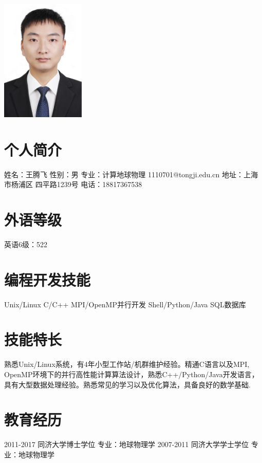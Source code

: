 \documentclass[]{friggeri-cv}
\begin{document}
       {}
\begin{aside}
\includegraphics[width=4cm]{IMG_4827small.jpg}
  \section{个人简介}
   姓名：王腾飞 
   性别：男
   专业：计算地球物理
   1110701@tongji.edu.cn
   地址：上海市杨浦区
   四平路1239号
   电话：18817367538
  \section{外语等级}
  英语6级：522
  \section{编程开发技能}
	Unix/Linux
    C/C++
	MPI/OpenMP并行开发
    Shell/Python/Java
	SQL数据库
\end{aside}

\section{技能特长}
\large
熟悉Unix/Linux系统，有4年小型工作站/机群维护经验。精通C语言以及MPI,\\
OpenMP环境下的并行高性能计算算法设计，熟悉C++/Python/Java开发语言，\\
具有大型数据处理经验。熟悉常见的学习以及优化算法，具备良好的数学基础.\\

\section{教育经历}
\begin{entrylist}
  \entryTwo
    {2011-2017}
    {同济大学博士学位 \quad 专业：地球物理学}
  \entryTwo
    {2007-2011}
    {同济大学学士学位 \quad 专业：地球物理学}
\end{entrylist}
\end{document}
